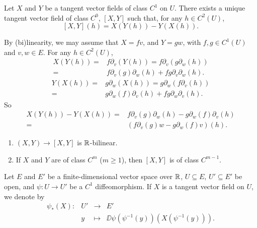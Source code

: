 \begin{propositionenv}
    Let $X$ and $Y$ be a tangent vector fields of class $C^1$ on $U$.
    There exists a unique tangent vector field of class $C^0$, $[X,Y]$ such that, for any $h \in C^2(U)$,
    $$[X,Y](h) = X\left(Y(h)\right) - Y\left(X(h)\right).$$
\end{propositionenv}
\begin{proofenv}
    By (bi)linearity, we may assume that $X = f v$, and $Y = g w$, with $f,g \in C^1(U)$ and $v,w \in E$.
    For any $h \in C^2(U)$,
    $$\begin{aligned}
        X\left(Y(h)\right) = & f \partial_{v}(Y(h)) = f \partial_{v}(g\partial_{w}(h))\\
        = & f \partial_{v}(g) \partial_{w}(h) + fg \partial_{v}\partial_{w}(h).
    \end{aligned}$$
    $$\begin{aligned}
        Y\left(X(h)\right) = & g \partial_{w}(X(h)) = g \partial_{w}(f\partial_{v}(h))\\
        = & g \partial_{w}(f) \partial_{v}(h) + fg \partial_{w}\partial_{v}(h).
    \end{aligned}$$
    So
    $$\begin{aligned}
        X\left(Y(h)\right) - Y\left(X(h)\right) = & f\partial_{v}(g)\partial_{w}(h) - g\partial_{w}(f)\partial_{v}(h)\\
        = & \left(f \partial_{v} (g) w - g \partial_{w}(f) v\right)(h).
    \end{aligned}$$
\end{proofenv}

\begin{remark}
    \quad
    \begin{enumerate}
        \item $(X,Y) \rightarrow [X,Y]$ is $\mathbb{R}$-bilinear.
        \item If $X$ and $Y$ are of class $C^m$ ($m \ge 1$), then $[X,Y]$ is of class $C^{m-1}$.
    \end{enumerate}
\end{remark}

\begin{definitionenv}
    Let $E$ and $E'$ be a finite-dimensional vector space over $\mathbb{R}$, $U \subseteq E$, $U' \subseteq E'$ be open,
    and $\psi : U \rightarrow U'$ be a $C^1$ diffeomorphism.
    If $X$ is a tangent vector field on $U$, we denote by
    $$\begin{array}{rrcl}
        \psi_* (X): & U' & \longrightarrow & E'\\
                    & y  & \longmapsto     & \DD\psi\left(\psi^{-1}(y)\right)\left(X (\psi^{-1}(y))\right).
    \end{array}$$
\end{definitionenv}

